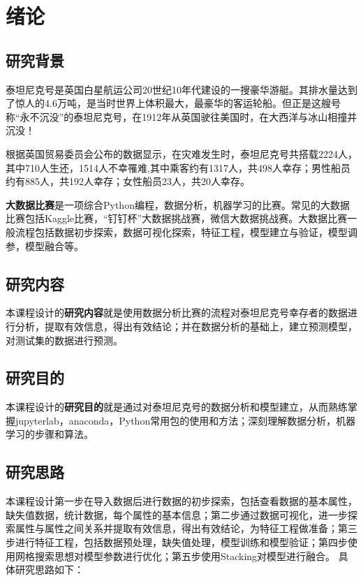 \section{绪论}
\subsection{研究背景}
泰坦尼克号是英国白星航运公司20世纪10年代建设的一搜豪华游艇。其排水量达到了惊人的4.6万吨，是当时世界上体积最大，最豪华的客运轮船。但正是这艘号称“永不沉没”的泰坦尼克号，在1912年从英国驶往美国时，在大西洋与冰山相撞并沉没！

根据英国贸易委员会公布的数据显示，在灾难发生时，泰坦尼克号共搭载2224人，其中710人生还，1514人不幸罹难,其中乘客约有1317人，共498人幸存；男性船员约有885人，共192人幸存；女性船员23人，共20人幸存。


\textbf{大数据比赛}是一项综合Python编程，数据分析，机器学习的比赛。常见的大数据比赛包括Kaggle比赛，“钉钉杯”大数据挑战赛，微信大数据挑战赛。大数据比赛一般流程包括数据初步探索，数据可视化探索，特征工程，模型建立与验证，模型调参，模型融合等。
\subsection{研究内容}
本课程设计的\textbf{研究内容}就是使用数据分析比赛的流程对泰坦尼克号幸存者的数据进行分析，提取有效信息，得出有效结论；并在数据分析的基础上，建立预测模型，对测试集的数据进行预测。

\subsection{研究目的}
本课程设计的\textbf{研究目的}就是通过对泰坦尼克号的数据分析和模型建立，从而熟练掌握jupyterlab，anaconda，Python常用包的使用和方法；深刻理解数据分析，机器学习的步骤和算法。

\subsection{研究思路}
本课程设计第一步在导入数据后进行数据的初步探索，包括查看数据的基本属性，缺失值数据，统计数据，每个属性的基本信息；第二步通过数据可视化，进一步探索属性与属性之间关系并提取有效信息，得出有效结论，为特征工程做准备；第三步进行特征工程，包括数据预处理，缺失值处理，模型训练和模型验证；第四步使用网格搜索思想对模型参数进行优化；第五步使用Stacking对模型进行融合。
\clearpage
具体研究思路如下：



